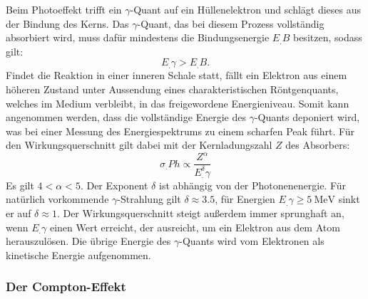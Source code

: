 Beim Photoeffekt trifft ein $\gamma$-Quant auf ein Hüllenelektron und schlägt dieses aus der Bindung des Kerns. Das $\gamma$-Quant, das bei diesem Prozess vollständig absorbiert wird, muss dafür mindestens die Bindungsenergie $E_.B$ besitzen, sodass gilt:
\[
E_.{\gamma}>E_.B\text{.}
\]
Findet die Reaktion in einer inneren Schale statt, fällt ein Elektron aus einem höheren Zustand unter Aussendung eines charakteristischen Röntgenquants, welches im Medium verbleibt, in das freigewordene Energieniveau. Somit kann angenommen werden, dass die vollständige Energie des $\gamma$-Quants deponiert wird, was bei einer Messung des Energiespektrums zu einem scharfen Peak führt.
Für den Wirkungsquerschnitt gilt dabei mit der Kernladungszahl $Z$ des Absorbers:
\[
\sigma_.{Ph}\propto\frac{Z^{\alpha}}{E^{\delta}_.{\gamma}}
\]
Es gilt $4 < \alpha < 5$.  Der Exponent $\delta$ ist abhängig von der Photonenenergie. Für natürlich vorkommende $\gamma$-Strahlung gilt $\delta\approx \num{3.5}$, für Energien $E_.{\gamma}\geq \SI{5}{\mega\electronvolt}$ sinkt er auf $\delta\approx 1$.
Der Wirkungsquerschnitt steigt außerdem immer sprunghaft an, wenn $E_.{\gamma}$ einen Wert erreicht, der ausreicht, um ein Elektron aus dem Atom herauszulösen. Die übrige Energie des $\gamma$-Quants wird vom Elektronen als kinetische Energie aufgenommen.

\subsubsection{Der Compton-Effekt}

